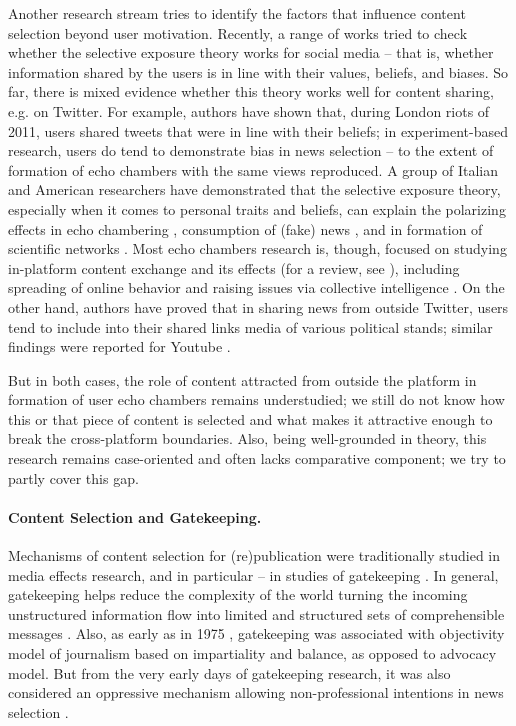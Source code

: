 Another research stream tries to identify the factors that influence content selection beyond user motivation. Recently, a range of works tried to check whether the selective exposure theory \cite{SearsPreedman} works for social media -- that is, whether information shared by the users is in line with their values, beliefs, and biases. So far, there is mixed evidence whether this theory works well for content sharing, e.g. on Twitter. For example, authors \cite{ThorsonWells} have shown that, during London riots of 2011, users shared tweets that were in line with their beliefs; in experiment-based research, users do tend to demonstrate bias in news selection \cite{MunsonResnick} -- to the extent of formation of echo chambers \cite{Garett} with the same views reproduced. A group of Italian and American researchers have demonstrated that the selective exposure theory, especially when it comes to personal traits and beliefs, can explain the polarizing effects in echo chambering \cite{QuattrociocchiCaldarelliScala}, consumption of (fake) news \cite{BessiCaldarelliDelVicario}, and in formation of scientific networks \cite{QuattrociocchiAmblardGaleota}. Most echo chambers research is, though, focused on studying in-platform content exchange and its effects (for a review, see \cite{Bessi}), including spreading of online behavior \cite{Centola} and raising issues via collective intelligence \cite{Levy,MaloneKlein}. On the other hand, authors \cite{MorganLampeShafiq} have proved that in sharing news from outside Twitter, users tend to include into their shared links media of various political stands; similar findings were reported for Youtube \cite{HalveyKeane}.

But in both cases, the role of content attracted from outside the platform in formation of user echo chambers remains understudied; we still do not know how this or that piece of content is selected and what makes it attractive enough to break the cross-platform boundaries. Also, being well-grounded in theory, this research remains case-oriented and often lacks comparative component; we try to partly cover this gap.

\paragraph{Content Selection and Gatekeeping.} Mechanisms of content selection for (re)publication were traditionally studied in media effects research, and in particular -- in studies of gatekeeping \cite{White1950}. In general, gatekeeping helps reduce the complexity of the world turning the incoming unstructured information flow into limited and structured sets of comprehensible messages \cite{Singer}. Also, as early as in 1975 \cite{Janowitz}, gatekeeping was associated with objectivity model of journalism based on impartiality and balance, as opposed to advocacy model. But from the very early days of gatekeeping research, it was also considered an oppressive mechanism allowing non-professional intentions in news selection \cite{Mills}.


